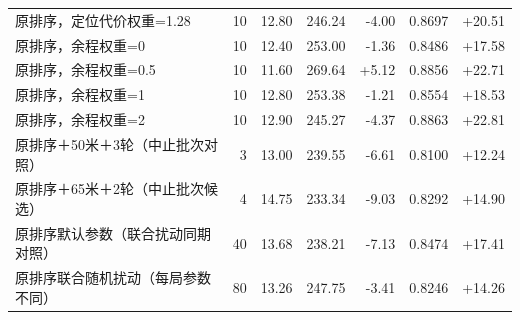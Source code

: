 \begin{longtable}{p{}rrrrrr}
原排序，定位代价权重=1.28 & 10 & 12.80 & 246.24 & -4.00 & 0.8697 & +20.51 \\
原排序，余程权重=0 & 10 & 12.40 & 253.00 & -1.36 & 0.8486 & +17.58 \\
原排序，余程权重=0.5 & 10 & 11.60 & 269.64 & +5.12 & 0.8856 & +22.71 \\
原排序，余程权重=1 & 10 & 12.80 & 253.38 & -1.21 & 0.8554 & +18.53 \\
原排序，余程权重=2 & 10 & 12.90 & 245.27 & -4.37 & 0.8863 & +22.81 \\
原排序＋50米＋3轮（中止批次对照） & 3 & 13.00 & 239.55 & -6.61 & 0.8100 & +12.24 \\
原排序＋65米＋2轮（中止批次候选） & 4 & 14.75 & 233.34 & -9.03 & 0.8292 & +14.90 \\
原排序默认参数（联合扰动同期对照） & 40 & 13.68 & 238.21 & -7.13 & 0.8474 & +17.41 \\
原排序联合随机扰动（每局参数不同） & 80 & 13.26 & 247.75 & -3.41 & 0.8246 & +14.26 \\
\end{longtable}\endgroup

